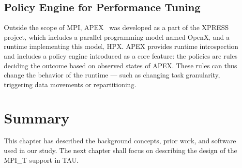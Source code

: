 \subsection{Policy Engine for Performance Tuning}

Outside the scope of MPI, APEX~\cite{Huck:2013:EPA:2491661.2481434} was developed as a part of the XPRESS project, which includes a parallel programming model named OpenX, and a runtime implementing this model, HPX. APEX provides runtime introspection and includes a policy engine introduced as a core feature: the policies are rules deciding the outcome based on observed states of APEX.
These rules can thus change the behavior of the runtime --- such as changing task granularity, triggering data movements or repartitioning.

\section{Summary}
This chapter has described the background concepts, prior work, and software used in our study. The next chapter shall focus on describing the design of the MPI\_T support in TAU.
